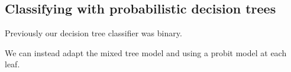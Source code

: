 
\subsection{Classifying with probabilistic decision trees}

Previously our decision tree classifier was binary.

We can instead adapt the mixed tree model and using a probit model at each leaf.


